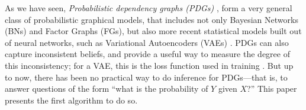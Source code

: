 As we have seen,
\emph{Probabilistic dependency graphs (PDGs)} \parencite{pdg-aaai},
form a very general class of probabilistic graphical models,
that includes not only
Bayesian Networks (BNs) and
Factor Graphs (FGs),
but also more recent statistical models built out of neural networks,
such as Variational Autoencoders (VAEs) \parencite{kingma2013autoencoding}.
PDGs can also capture inconsistent 
beliefs, and provide a useful way to measure the degree of this inconsistency;
for a VAE, this is the loss function used in training
    \parencite{one-true-loss}.
But up to now, there has been no practical way to do inference for
PDGs---that is,
to answer questions of the form
``what is the probability of $Y$ given $X$?''
This paper presents the first algorithm to do so.



